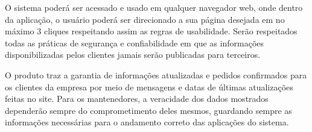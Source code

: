 O sistema poderá ser acessado e usado em qualquer navegador web, onde dentro da aplicação, o usuário poderá ser direcionado a sua página desejada em no máximo 3 cliques respeitando assim as regras de usabilidade. Serão respeitados todas as práticas de segurança e confiabilidade em que as informações disponibilizadas pelos clientes jamais serão publicadas para terceiros.

O produto traz a garantia de informações atualizadas e pedidos confirmados para os clientes da empresa por meio de mensagens e datas de últimas atualizações feitas no site. Para os mantenedores, a veracidade dos dados mostrados dependerão sempre do comprometimento deles mesmos, guardando sempre as informações necessárias para o andamento correto das aplicações do sistema.